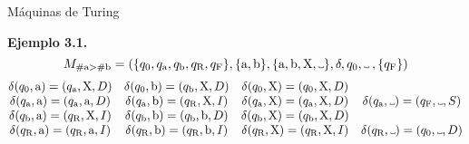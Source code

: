 \documentclass[10pt,xcolor=dvipsnames,aspectratio=169,spanish]{beamer}
\newcommand\Vtextvisiblespace[1][.3em]{%
\mbox{\kern.06em\vrule height.3ex}%
\vbox{\hrule width#1}%
\hbox{\vrule height.3ex}}
\begin{document}
\begin{frame}{Máquinas de Turing}

\textbf{Ejemplo 3.1}\textbf{.}
$$
    M_{\#\text{a}>\#\text{b}}=(\{q_0, q_\text{a}, q_\text{b}, q_\text{R}, q_\text{F}\}, \{\text{a}, \text{b}\}, \{\text{a}, \text{b}, \text{X}, \Vtextvisiblespace\}, \delta, q_0, \Vtextvisiblespace\:,\{q_\text{F}\})
$$
$$
    \begin{matrix}
        \delta(q_0, \text{a}) = (q_\text{a},\text{X},D) & \delta(q_0, \text{b}) = (q_\text{b},\text{X},D) & \delta(q_0, \text{X}) = (q_0,\text{X},D) &  \\
        \delta(q_\text{a}, \text{a}) = (q_\text{a},\text{a},D) & \delta(q_\text{a}, \text{b}) = (q_\text{R},\text{X},I) & \delta(q_\text{a}, \text{X}) = (q_\text{a},\text{X},D) & \delta(q_\text{a}, \Vtextvisiblespace) = (q_\text{F},\Vtextvisiblespace,S) \\
        \delta(q_\text{b}, \text{a}) = (q_\text{R},\text{X},I) & \delta(q_\text{b}, \text{b}) = (q_\text{b},\text{b},D) & \delta(q_\text{b}, \text{X}) = (q_\text{b},\text{X},D) &  \\
        \delta(q_\text{R}, \text{a}) = (q_\text{R},\text{a},I) & \delta(q_\text{R}, \text{b}) = (q_\text{R},\text{b},I) & \delta(q_\text{R}, \text{X}) = (q_\text{R},\text{X},I) & \delta(q_\text{R}, \Vtextvisiblespace) = (q_0,\Vtextvisiblespace,D) \\
    \end{matrix}
$$

\vspace{5mm}

\begin{adjustbox}{max height={.67\textheight},center}

\end{adjustbox}

\end{frame}
\end{document}
